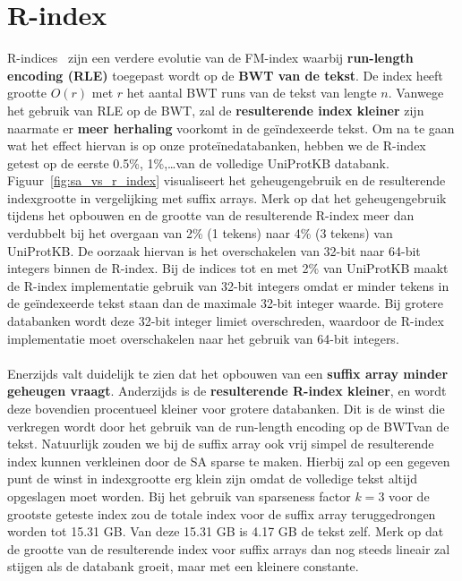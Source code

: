 \section{R-index}\label{sec:r-index}
R-indices~\cite{r_index2, r_index1} zijn een verdere evolutie van de FM-index waarbij \textbf{run-length encoding (RLE)} toegepast wordt op de \textbf{BWT van de tekst}.
De index heeft grootte $O(r)$ met $r$ het aantal BWT runs van de tekst van lengte $n$.
Vanwege het gebruik van RLE op de BWT, zal de \textbf{resulterende index kleiner} zijn naarmate er \textbf{meer herhaling} voorkomt in de geïndexeerde tekst.
Om na te gaan wat het effect hiervan is op onze proteïnedatabanken, hebben we de R-index getest op de eerste 0.5\%, 1\%,\ldots\space van de volledige UniProtKB databank.
Figuur~\ref{fig:sa_vs_r_index} visualiseert het geheugengebruik en de resulterende indexgrootte in vergelijking met suffix arrays.
Merk op dat het geheugengebruik tijdens het opbouwen en de grootte van de resulterende R-index meer dan verdubbelt bij het overgaan van 2\% (1 tekens) naar 4\% (3 tekens) van UniProtKB\@.
De oorzaak hiervan is het overschakelen van 32-bit naar 64-bit integers binnen de R-index.
Bij de indices tot en met 2\% van UniProtKB maakt de R-index implementatie gebruik van 32-bit integers omdat er minder tekens in de geïndexeerde tekst staan dan de maximale 32-bit integer waarde.
Bij grotere databanken wordt deze 32-bit integer limiet overschreden, waardoor de R-index implementatie moet overschakelen naar het gebruik van 64-bit integers.
\\ \\
Enerzijds valt duidelijk te zien dat het opbouwen van een \textbf{suffix array minder geheugen vraagt}.
Anderzijds is de \textbf{resulterende R-index kleiner}, en wordt deze bovendien procentueel kleiner voor grotere databanken.
Dit is de winst die verkregen wordt door het gebruik van de run-length encoding op de BWT\@ van de tekst.
Natuurlijk zouden we bij de suffix array ook vrij simpel de resulterende index kunnen verkleinen door de SA sparse te maken.
Hierbij zal op een gegeven punt de winst in indexgrootte erg klein zijn omdat de volledige tekst altijd opgeslagen moet worden.
Bij het gebruik van sparseness factor $k = 3$ voor de grootste geteste index zou de totale index voor de suffix array teruggedrongen worden tot 15.31 GB\@.
Van deze 15.31 GB is 4.17 GB de tekst zelf.
Merk op dat de grootte van de resulterende index voor suffix arrays dan nog steeds lineair zal stijgen als de databank groeit, maar met een kleinere constante.
